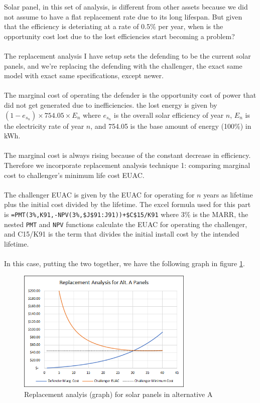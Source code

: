 \documentclass[10pt,letterpaper]{article}
\begin{document}
Solar panel, in this set of analysis, is different from other assets because we did not assume to have a flat replacement rate due to its long lifespan. But given that the efficiency is deteriating at a rate of 0.5\% per year, when is the opportunity cost lost due to the lost efficiencies start becoming a problem?\\
\\
The replacement analysis I have setup sets the defending to be the current solar panels, and we're replacing the defending with the challenger, the exact same model with exact same specifications, except newer.\\
\\
The marginal cost of operating the defender is the opportunity cost of power that did not get generated due to inefficiencies. the lost energy is given by $(1-e_{s_n})\times 754.05\times E_n$ where $e_{s_n}$ is the overall solar efficiency of year $n$, $E_n$ is the electricity rate of year $n$, and 754.05 is the base amount of energy (100\%) in kWh.\\
\\
The marginal cost is always rising because of the constant decrease in efficiency. Therefore we incorporate replacement analysis technique 1: comparing marginal cost to challenger's minimum life cost EUAC.\\
\\
The challenger EUAC is given by the EUAC for operating for $n$ years as lifetime plus the initial cost divided by the lifetime. The excel formula used for this part is \texttt{=PMT(3\%,K91,-NPV(3\%,\$J\$91:J91))+\$C\$15/K91} where 3\% is the MARR, the nested \texttt{PMT} and \texttt{NPV} functions calculate the EUAC for operating the challenger, and C15/K91 is the term that divides the initial install cost by the intended lifetime.\\
\\
In this case, putting the two together, we have the following graph in figure \ref{fig:a-replacement}.\\

\begin{figure}[H]
	\centering
	\includegraphics[width=0.75\textwidth]{assets/1534568110958}
	\caption{Replacement analyis (graph) for solar panels in alternative A}
	\label{fig:a-replacement}
\end{figure}
\end{document}
